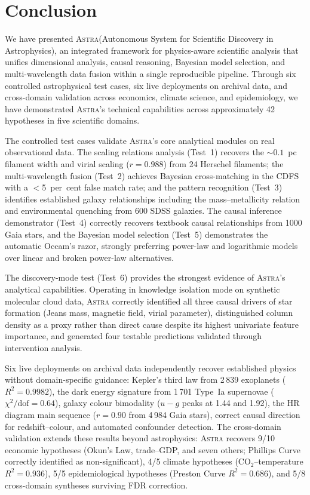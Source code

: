 \documentclass[usenatbib]{rasti}
\newcommand{\astra}{\textsc{Astra}\xspace}
\begin{document}
\section{Conclusion}
\label{sec:conclusion}

We have presented \astra (Autonomous System for Scientific Discovery in Astrophysics), an integrated framework for physics-aware scientific analysis that unifies dimensional analysis, causal reasoning, Bayesian model selection, and multi-wavelength data fusion within a single reproducible pipeline.
Through six controlled astrophysical test cases, six live deployments on archival data, and cross-domain validation across economics, climate science, and epidemiology, we have demonstrated \astra's technical capabilities across approximately 42 hypotheses in five scientific domains.

The controlled test cases validate \astra's core analytical modules on real observational data.
The scaling relations analysis (Test~1) recovers the ${\sim}0.1$~pc filament width and virial scaling ($r = 0.988$) from 24 Herschel filaments; the multi-wavelength fusion (Test~2) achieves Bayesian cross-matching in the CDFS with a $<$5~per~cent false match rate; and the pattern recognition (Test~3) identifies established galaxy relationships including the mass--metallicity relation and environmental quenching from 600 SDSS galaxies.
The causal inference demonstrator (Test~4) correctly recovers textbook causal relationships from 1000 Gaia stars, and the Bayesian model selection (Test~5) demonstrates the automatic Occam's razor, strongly preferring power-law and logarithmic models over linear and broken power-law alternatives.

The discovery-mode test (Test~6) provides the strongest evidence of \astra's analytical capabilities.
Operating in knowledge isolation mode on synthetic molecular cloud data, \astra correctly identified all three causal drivers of star formation (Jeans mass, magnetic field, virial parameter), distinguished column density as a proxy rather than direct cause despite its highest univariate feature importance, and generated four testable predictions validated through intervention analysis.

Six live deployments on archival data independently recover established physics without domain-specific guidance: Kepler's third law from 2\,839 exoplanets ($R^{2}=0.9982$), the dark energy signature from 1\,701 Type~Ia supernovae ($\chi^{2}/\mathrm{dof}=0.64$), galaxy colour bimodality ($u{-}g$ peaks at 1.44 and 1.92), the HR diagram main sequence ($r=0.90$ from 4\,984 Gaia stars), correct causal direction for redshift--colour, and automated confounder detection.
The cross-domain validation extends these results beyond astrophysics: \astra recovers 9/10 economic hypotheses (Okun's Law, trade--GDP, and seven others; Phillips Curve correctly identified as non-significant), 4/5 climate hypotheses (CO$_{2}$--temperature $R^{2}=0.936$), 5/5 epidemiological hypotheses (Preston Curve $R^{2}=0.686$), and 5/8 cross-domain syntheses surviving FDR correction.
\end{document}
